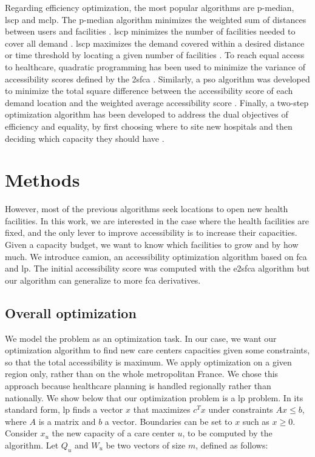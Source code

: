 Regarding efficiency optimization, the most popular algorithms are p-median, \ac{lscp} and \ac{mclp}. The p-median algorithm minimizes the weighted sum of distances between users and facilities \cite{murad_using_2021}. \ac{lscp} minimizes the number of facilities needed to cover all demand \cite{shavandi_fuzzy_2006}. \ac{lscp} maximizes the demand covered within a desired distance or time threshold by locating a given number of facilities \cite{casado_heuristical_2005}.
To reach equal access to healthcare, quadratic programming has been used to  minimize the variance of accessibility scores defined by the \ac{2sfca} \cite{wang_planning_2013}. Similarly, a \ac{pso} algorithm was developed to minimize the total square difference between the accessibility score of each demand location and the weighted average accessibility score \cite{tao_spatial_2014}. Finally, a two-step optimization algorithm has been developed to address the dual objectives of efficiency and equality, by first choosing where to site new hospitals and then deciding which capacity they should have \cite{luo_two-step_2017,li_two-step_2017}.

\section{Methods}

However, most of the previous algorithms seek locations to open new health facilities. In this work, we are interested in the case where the health facilities are fixed, and the only lever to improve accessibility is to increase their capacities. Given a capacity budget, we want to know which facilities to grow and by how much. We introduce \ac{camion}, an accessibility optimization algorithm based on \ac{fca} and \ac{lp}. The initial accessibility score was computed with the \ac{e2sfca} algorithm \cite{luo_enhanced_2009} but our algorithm can generalize to more \ac{fca} derivatives.

\subsection{Overall optimization}

We model the problem as an optimization task. In our case, we want our optimization algorithm to find new care centers capacities given some constraints, so that the total accessibility is maximum. We apply optimization on a given region only, rather than on the whole metropolitan France. We chose this approach because healthcare planning is handled regionally rather than nationally. We show below that our optimization problem is a \ac{lp} problem.
In its standard form, \ac{lp} finds a vector $x$ that maximizes $c^T x$ under constraints $Ax \leq b$, where $A$ is a matrix and $b$ a vector. Boundaries can be set to $x$ such as $x \geq 0$. Consider $x_u$ the new capacity of a care center $u$, to be computed by the algorithm. Let $Q_u$ and $W_u$ be two vectors of size $m$, defined as follows:

